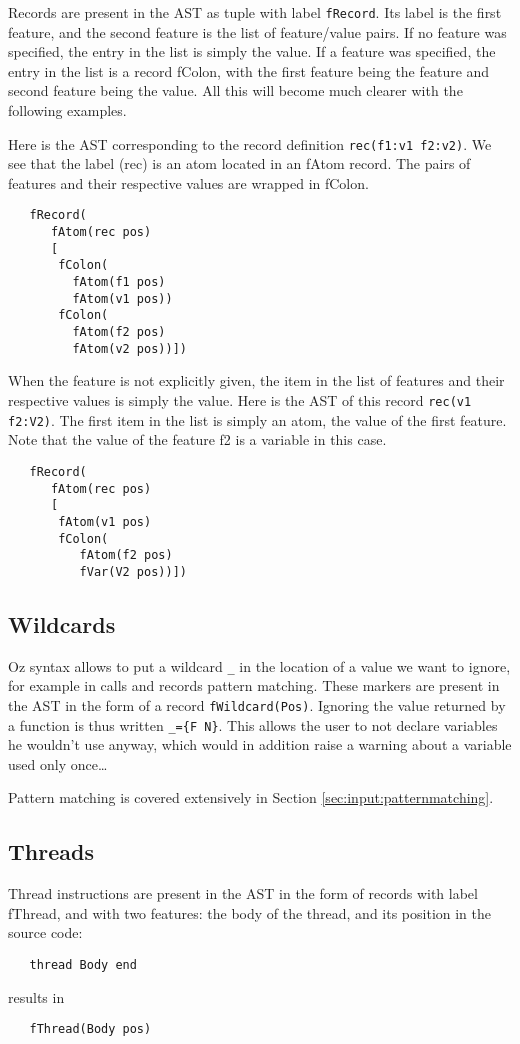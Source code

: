 \documentclass[a4paper]{memoir}
\begin{document}
Records are present in the AST as tuple with label \lstinline!fRecord!. Its
label is the first feature, and the second feature is the list of feature/value
pairs. If no feature was specified, the entry in the list is simply the value.
If a feature was specified, the entry in the list is a record fColon, with the
first feature being the feature and second feature being the value. All this
will become much clearer with the following examples.

Here is the AST corresponding to the record definition \lstinline!rec(f1:v1 f2:v2)!. We see that the label (rec) is an atom located in an fAtom record. The pairs of features and their respective values are wrapped in fColon.

\begin{lstlisting}
   fRecord(
      fAtom(rec pos)
      [
       fColon(
         fAtom(f1 pos)
         fAtom(v1 pos))
       fColon(
         fAtom(f2 pos)
         fAtom(v2 pos))])
\end{lstlisting}

When the feature is not explicitly given, the item in the list of features and their respective values is simply the value. Here is the AST of this record \lstinline!rec(v1 f2:V2)!. The first item in the list is simply an atom, the value of the first feature. Note that the value of the feature f2 is a variable in this case.

\begin{lstlisting}
   fRecord(
      fAtom(rec pos)
      [
       fAtom(v1 pos)
       fColon(
          fAtom(f2 pos)
          fVar(V2 pos))])
\end{lstlisting}


\subsection{Wildcards}\label{sec:input:wildcard}
Oz syntax allows to put a wildcard \lstinline!_! in the location of a value we want to ignore, for example in calls and records pattern matching. These markers are present in the AST in the form of a record \lstinline!fWildcard(Pos)!.
Ignoring the value returned by a function is thus written \lstinline!_={F N}!. 
This allows the user to not declare variables he wouldn't use anyway, which would in addition raise a warning about a variable used only once\ldots

Pattern matching is covered extensively in Section \ref{sec:input:patternmatching}.

\subsection{Threads}
Thread instructions are present in the AST in the form of records with label fThread, and with two features: the body of the thread, and its position in the source code:
\begin{lstlisting}
   thread Body end
\end{lstlisting}
results in
\begin{lstlisting}
   fThread(Body pos)
\end{lstlisting}
\end{document}
